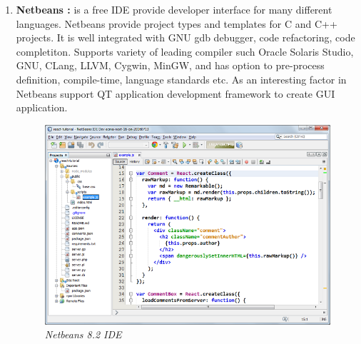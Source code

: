 \documentclass[12pt]{article}
\begin{document}
{{\begin{enumerate}
Microsoft C and C++ compiler and linker is the cl.exe that produce the Common Object File Format(COFF), objetc file (.obj) and produce the executable (.exe)file or dynamic-link(Dlls) libraries. 

MSVS has built in version control and can connect to different version control systems:
\begin{enumerate}
\item Git
\item GitHub
\item AnkhSVN
\item Team Foundation Version Control(TFVC)
\item other extensions
\end{enumerate} 

Supported platforms : 
\begin{enumerate}
\item Windows
\item MacOS from 2017
\end{enumerate}

\item \textbf{Netbeans : } is a free IDE provide developer interface for many different languages. Netbeans provide project types and templates for C and C++ projects. It is well integrated with GNU gdb debugger, code refactoring, code completiton. Supports variety of leading compiler such Oracle Solaris Studio, GNU, CLang, LLVM, Cygwin, MinGW, and has option to pre-process definition, compile-time, language standards etc. As an interesting factor in Netbeans support QT application development framework to create GUI application.\cite{Netbeans}\\

\begin{figure}[h!]
\centering
\includegraphics[scale=0.5]{Pictures/netbeans.png}
\caption{\textit{\color{gray}Netbeans 8.2 IDE \cite{netbeans2}}}
\end{figure}


\end{enumerate}}}
\end{document}
